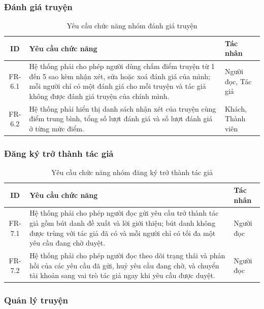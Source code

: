 \subsubsection{Đánh giá truyện}

\begin{table}[H]
\centering
\renewcommand{\arraystretch}{1.3}
\begin{tabularx}{\textwidth}{|c|X|p{3cm}|}
\hline
\textbf{ID} & \textbf{Yêu cầu chức năng} & \textbf{Tác nhân} \\ \hline
FR-6.1 & Hệ thống phải cho phép người dùng chấm điểm truyện từ 1 đến 5 sao kèm nhận xét, sửa hoặc xoá đánh giá của mình; mỗi người chỉ có một đánh giá cho mỗi truyện và tác giả không được đánh giá truyện của chính mình. & Người đọc, Tác giả \\ \hline
FR-6.2 & Hệ thống phải hiển thị danh sách nhận xét của truyện cùng điểm trung bình, tổng số lượt đánh giá và số lượt đánh giá ở từng mức điểm. & Khách, Thành viên \\ \hline
\end{tabularx}
\caption{Yêu cầu chức năng nhóm đánh giá truyện}
\label{tab:fr-rating}
\end{table}

\subsubsection{Đăng ký trở thành tác giả}

\begin{table}[H]
\centering
\renewcommand{\arraystretch}{1.3}
\begin{tabularx}{\textwidth}{|c|X|p{3cm}|}
\hline
\textbf{ID} & \textbf{Yêu cầu chức năng} & \textbf{Tác nhân} \\ \hline
FR-7.1 & Hệ thống phải cho phép người đọc gửi yêu cầu trở thành tác giả gồm bút danh đề xuất và lời giới thiệu; bút danh không được trùng với tác giả đã có và mỗi người chỉ có tối đa một yêu cầu đang chờ duyệt. & Người đọc \\ \hline
FR-7.2 & Hệ thống phải cho phép người đọc theo dõi trạng thái và phản hồi của các yêu cầu đã gửi, huỷ yêu cầu đang chờ, và chuyển tài khoản sang vai trò tác giả ngay khi yêu cầu được duyệt. & Người đọc \\ \hline
\end{tabularx}
\caption{Yêu cầu chức năng nhóm đăng ký trở thành tác giả}
\label{tab:fr-author-request}
\end{table}

\subsubsection{Quản lý truyện}

